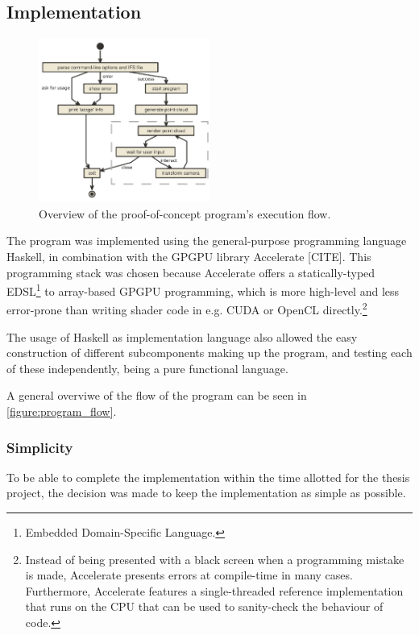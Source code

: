 \documentclass[11pt]{article}
\begin{document}
\subsection{Implementation}
\label{sec:org906b022}

\begin{figure}
  \centering
  \includegraphics[width=0.5\textwidth]{figures/program_execution}
  \caption{Overview of the proof-of-concept program's execution flow.}
\label{figure:program_flow}
\end{figure}

The program was implemented using the general-purpose programming language Haskell, 
in combination with the GPGPU library Accelerate [CITE].
This programming stack was chosen because Accelerate 
offers a statically-typed EDSL\footnote{Embedded Domain-Specific Language.} to array-based GPGPU programming,
which is more high-level and less error-prone than writing shader code in e.g. CUDA or OpenCL directly.\footnote{Instead of being presented with a black screen when a programming mistake is made, 
Accelerate presents errors at compile-time in many cases. Furthermore, Accelerate features a
single-threaded reference implementation that runs on the CPU that can be used to sanity-check the behaviour of code.}

The usage of Haskell as implementation language also allowed 
the easy construction of different subcomponents making up the program,
and testing each of these independently, being a pure functional language.

A general overviwe of the flow of the program can be seen in \autoref{figure:program_flow}.

\subsubsection{Simplicity}
\label{sec:org6e09222}

To be able to complete the implementation within the time allotted for the thesis project,
the decision was made to keep the implementation as simple as possible.
\end{document}
